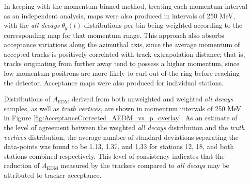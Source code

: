 In keeping with the momentum-binned method, treating each momentum interval as an independent analysis, maps were also produced in intervals of 250 MeV, with the \textit{all decays} $\theta_{y}(t)$ distributions per bin being weighted according to the corresponding map for that momentum range. This approach also absorbs acceptance variations along the azimuthal axis, since the average momentum of accepted tracks is positively correlated with track extrapolation distance; that is, tracks originating from further away tend to possess a higher momentum, since low momentum positrons are more likely to curl out of the ring before reaching the detector. Acceptance maps were also produced for individual stations.

Distributions of $A_{\text{EDM}}$ derived from both unweighted and weighted \textit{all decays} samples, as well as \textit{truth vertices}, are shown in momentum intervals of 250 MeV in Figure \ref{fig:AcceptanceCorrected_AEDM_vs_p_overlay}. As an estimate of the level of agreement between the weighted \textit{all decays} distribution and the \textit{truth vertices} distribution, the average number of standard deviations separating the data-points was found to be 1.13, 1.37, and 1.33 for stations 12, 18, and both stations combined respectively. This level of consistency indicates that the reduction of $A_{\text{EDM}}$ measured by the trackers compared to \textit{all decays} may be attributed to tracker acceptance.  


